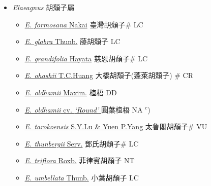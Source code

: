 
  \begin{itemize}
 \item[] \textit{Elaeagnus} 胡頹子屬
                    
  \begin{itemize}
        \item[] \href{http://www.theplantlist.org/tpl1.1/search?q=Elaeagnus+formosana}{\textit{E. formosana} Nakai}   臺灣胡頹子\# LC
        \item[] \href{http://www.theplantlist.org/tpl1.1/search?q=Elaeagnus+glabra}{\textit{E. glabra} Thunb.}   藤胡頹子 LC
        \item[] \href{http://www.theplantlist.org/tpl1.1/search?q=Elaeagnus+grandifolia}{\textit{E. grandifolia} Hayata}   慈恩胡頹子\# LC
        \item[] \href{http://www.theplantlist.org/tpl1.1/search?q=Elaeagnus+ohashii}{\textit{E. ohashii} T.C.Huang}     大橋胡頹子(蓬萊胡頹子)  \# CR
        \item[] \href{http://www.theplantlist.org/tpl1.1/search?q=Elaeagnus+oldhamii}{\textit{E. oldhamii} Maxim.}   椬梧 DD
        \item[] \href{http://www.theplantlist.org/tpl1.1/search?q=Elaeagnus+oldhamii+cv.+‘Round’}{\textit{E. oldhamii}  cv. \textit{‘Round’} }   圓葉椬梧 NA $^c$)
        \item[] \href{http://www.theplantlist.org/tpl1.1/search?q=Elaeagnus+tarokoensis}{\textit{E. tarokoensis} S.Y.Lu \& Yuen P.Yang}   太魯閣胡頹子\# VU
        \item[] \href{http://www.theplantlist.org/tpl1.1/search?q=Elaeagnus+thunbergii}{\textit{E. thunbergii} Serv.}   鄧氏胡頹子\# LC
        \item[] \href{http://www.theplantlist.org/tpl1.1/search?q=Elaeagnus+triflora}{\textit{E. triflora} Roxb.}   菲律賓胡頹子 NT
        \item[] \href{http://www.theplantlist.org/tpl1.1/search?q=Elaeagnus+umbellata}{\textit{E. umbellata} Thunb.}   小葉胡頹子 LC
  \end{itemize}
  \end{itemize}
